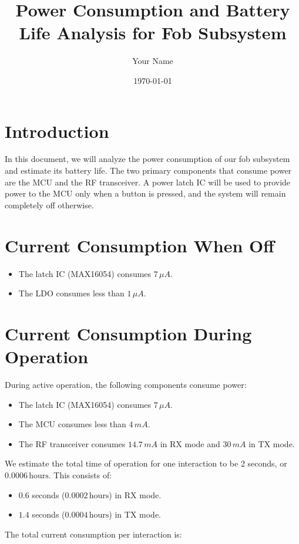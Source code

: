 \documentclass{article}
\title{Power Consumption and Battery Life Analysis for Fob Subsystem}
\author{Your Name}
\date{\today}
\begin{document}
\maketitle

\section{Introduction}
In this document, we will analyze the power consumption of our fob subsystem and estimate its battery life. The two primary components that consume power are the MCU and the RF transceiver. A power latch IC will be used to provide power to the MCU only when a button is pressed, and the system will remain completely off otherwise.


\section{Current Consumption When Off}
\begin{itemize}
    \item The latch IC (MAX16054) consumes \(7 \, \mu A\).
    \item The LDO consumes less than \(1 \, \mu A\).
\end{itemize}

\section{Current Consumption During Operation}
During active operation, the following components consume power:
\begin{itemize}
    \item The latch IC (MAX16054) consumes \(7 \, \mu A\).
    \item The MCU consumes less than \(4 \, mA\).
    \item The RF transceiver consumes \(14.7 \, mA\) in RX mode and \(30 \, mA\) in TX mode.
\end{itemize}

We estimate the total time of operation for one interaction to be 2 seconds, or \(0.0006 \, \text{hours}\). This consists of:
\begin{itemize}
    \item \(0.6\) seconds (\(0.0002 \, \text{hours}\)) in RX mode.
    \item \(1.4\) seconds (\(0.0004 \, \text{hours}\)) in TX mode.
\end{itemize}

The total current consumption per interaction is:
\end{document}
